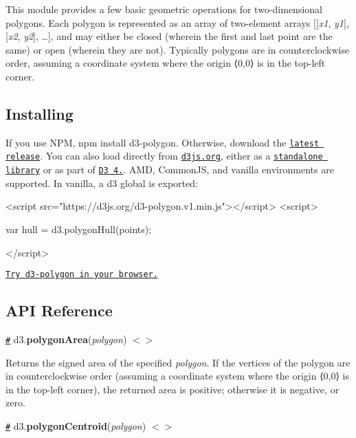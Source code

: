 This module provides a few basic geometric operations for two-\/dimensional polygons. Each polygon is represented as an array of two-\/element arrays \mbox{[}​\mbox{[}{\itshape x1}, {\itshape y1}\mbox{]}, \mbox{[}{\itshape x2}, {\itshape y2}\mbox{]}, …\mbox{]}, and may either be closed (wherein the first and last point are the same) or open (wherein they are not). Typically polygons are in counterclockwise order, assuming a coordinate system where the origin ⟨0,0⟩ is in the top-\/left corner.

\subsection*{Installing}

If you use N\+PM, {\ttfamily npm install d3-\/polygon}. Otherwise, download the \href{https://github.com/d3/d3-polygon/releases/latest}{\tt latest release}. You can also load directly from \href{https://d3js.org}{\tt d3js.\+org}, either as a \href{https://d3js.org/d3-polygon.v1.min.js}{\tt standalone library} or as part of \href{https://github.com/d3/d3}{\tt D3 4.}. A\+MD, Common\+JS, and vanilla environments are supported. In vanilla, a {\ttfamily d3} global is exported\+:


\begin{DoxyCode}
<script src="https://d3js.org/d3-polygon.v1.min.js"></script>
<script>

var hull = d3.polygonHull(points);

</script>
\end{DoxyCode}


\href{https://tonicdev.com/npm/d3-polygon}{\tt Try d3-\/polygon in your browser.}

\subsection*{A\+PI Reference}

\href{#polygonArea}{\tt \#} d3.{\bfseries polygon\+Area}({\itshape polygon}) \href{https://github.com/d3/d3-polygon/blob/master/src/area.js#L1}{\tt $<$$>$}

Returns the signed area of the specified {\itshape polygon}. If the vertices of the polygon are in counterclockwise order (assuming a coordinate system where the origin ⟨0,0⟩ is in the top-\/left corner), the returned area is positive; otherwise it is negative, or zero.

\href{#polygonCentroid}{\tt \#} d3.{\bfseries polygon\+Centroid}({\itshape polygon}) \href{https://github.com/d3/d3-polygon/blob/master/src/centroid.js#L1}{\tt $<$$>$}

